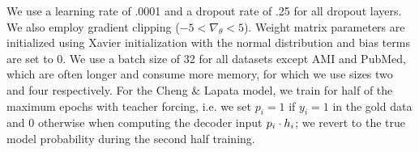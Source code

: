     We use a learning rate of .0001 and a dropout rate of .25 for all dropout
    layers. We also employ gradient clipping ($-5 < \nabla_\theta < 5$).
Weight matrix parameters are initialized using 
    Xavier initialization with the normal distribution 
    \cite{glorot2010understanding} and bias terms are set to 0.
    We use a batch size of 32 for all datasets except AMI and PubMed, which
    are often longer and consume more memory, for
    which we use sizes two and four respectively.
    For the Cheng \& Lapata model, we train for half of the maximum epochs 
    with teacher forcing, i.e. we set $p_i = 1$
    if $y_i = 1$ in the gold data and 0 otherwise 
    when computing the decoder input 
    $p_i \cdot \sentEmb[i]$; we revert to the true model probability 
    during the second half training.




